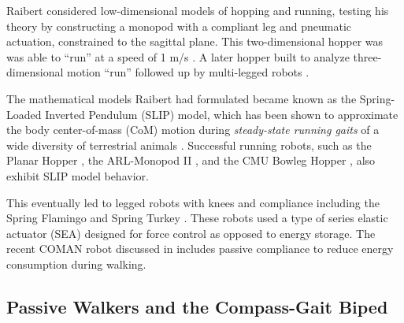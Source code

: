 Raibert considered low-dimensional models of hopping and running, testing his
theory by constructing a monopod with a compliant leg and pneumatic actuation,
constrained to the sagittal plane.
%
This two-dimensional hopper was was able to ``run'' at a speed of 1 m/s
\cite{Raibert1984, Raibert1986, Raibert1984a}.
%
A later hopper built to analyze three-dimensional motion ``run''
\cite[Chap.~3]{Raibert1986} followed up by multi-legged robots
\cite{Hodgins1991, Raibert1990, Raibert1986a}.
%

The mathematical models Raibert had formulated became known as the Spring-Loaded
Inverted Pendulum (SLIP) model, which has been shown to approximate the body
center-of-mass (CoM) motion during \textit{steady-state running gaits} of a wide
diversity of terrestrial animals \cite{Blickhan1989, Mcmahon1990, Farley1993,
  Full2000, Dickinson2000, Seyfarth2002}.
%
Successful running robots, such as the Planar Hopper \cite{Raibert1986},
the ARL-Monopod II \cite{Ahmadi2006}, and the CMU Bowleg Hopper
\cite{Zeglin1998}, also exhibit SLIP model behavior.
%

This eventually led to legged robots with knees and compliance including the
Spring Flamingo and Spring Turkey \cite{Hollerbach1992, Pratt1999, Pratt2000,
  Pratt2001}.
%
These robots used a type of series elastic actuator (SEA) designed for force
control as opposed to energy storage.
%
The recent COMAN robot discussed in \cite{Li2013} includes passive
compliance to reduce energy consumption during walking.


\subsection{Passive Walkers and the Compass-Gait Biped} \label{sec:literature-passive-walkers}

